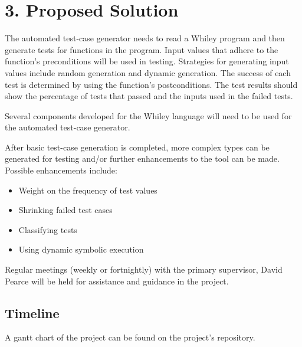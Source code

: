 \documentclass[11pt, a4paper, twoside, openright]{report}
\begin{document}
\section*{3. Proposed Solution}

The automated test-case generator needs to read a Whiley program and then generate tests for functions in the program. 
Input values that adhere to the function's preconditions will be used in testing. Strategies for generating input values include random generation and dynamic generation.
The success of each test is determined by using the function's postconditions. 
The test results should show the percentage of tests that passed and the inputs used in the failed tests.

Several components developed for the Whiley language will need to be used for the automated test-case generator. 

After basic test-case generation is completed, more complex types can be generated for testing and/or further enhancements to the tool can be made. \\

Possible enhancements include:
\begin{itemize}
	\item Weight on the frequency of test values
	\item Shrinking failed test cases
	\item Classifying tests
	\item Using dynamic symbolic execution
\end{itemize} 

Regular meetings (weekly or fortnightly) with the primary supervisor, David Pearce will be held for assistance and guidance in the project.

\subsection*{Timeline}
A gantt chart of the project can be found on the project's repository.
\end{document}
